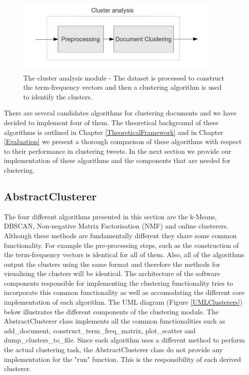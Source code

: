 \begin{figure}[htbp]
  \begin{center}
    \includegraphics[height=1.5in, width=4in]{clustering-overview}
    \caption{The cluster analysis module - The dataset is processed to construct the term-frequency vectors and then a clustering algorithm is used to identify the clusters.}
    \label{ClusteringOverview}
  \end{center}
\end{figure} 

There are several candidates algorithms for clustering documents and we have decided to implement four of them. The theoretical background of these algorithms is outlined in Chapter \ref{TheoreticalFramework} and in Chapter \ref{Evaluation} we present a thorough comparison of these algorithms with respect to their performance in clustering tweets.  
In the next section we provide our implementation of these algorithms and the components that are needed for clustering. 

\subsection{AbstractClusterer}
The four different algorithms presented in this section are the k-Means, DBSCAN, Non-negative Matrix Factorisation (NMF) and online clusterers. Although these methods are fundamentally different they share some common functionality. For example the pre-processing steps, such as the construction of the term-frequency vectors is identical for all of them. Also, all of the algorithms output the clusters using the same format and therefore the methods for visualising the clusters will be identical. The architecture of the software components responsible for implementing the clustering functionality tries to incorporate this common functionality as well as accomodating the different core implementation of each algorithm. The UML diagram (Figure \ref{UMLClusterers}) below illustrates the different components of the clustering module. The AbstractClusterer class implements all the common functionalities such as add\_document, construct\_term\_freq\_matrix, plot\_scatter and dump\_clusters\_to\_file. Since each algorithm uses a different method to perform the actual clustering task, the AbstractClusterer class do not provide any implementation for the "run" function. This is the responsibility of each derived clusterer. 

